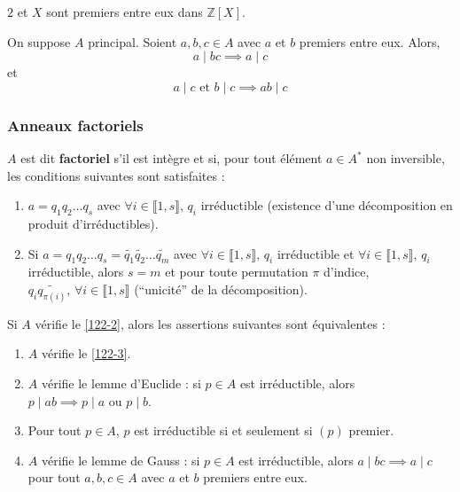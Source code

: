   \begin{example}
    $2$ et $X$ sont premiers entre eux dans $\mathbb{Z}[X]$.
  \end{example}

  \begin{lemma}[Gauss]
    On suppose $A$ principal. Soient $a, b, c \in A$ avec $a$ et $b$ premiers entre eux. Alors,
    \[ a \mid bc \implies a \mid c \]
    et
    \[ a \mid c \text{ et } b \mid c \implies ab \mid c \]
  \end{lemma}

  \subsubsection{Anneaux factoriels}


  \begin{definition}
    $A$ est dit \textbf{factoriel} s'il est intègre et si, pour tout élément $a \in A^*$ non inversible, les conditions suivantes sont satisfaites :
    \begin{enumerate}[label=(\roman*)]
      \item \label{122-2} $a = q_1 q_2 \dots q_s$ avec $\forall i \in \llbracket 1, s \rrbracket, \, q_i$ irréductible (existence d'une décomposition en produit d'irréductibles).
      \item \label{122-3} Si $a = q_1 q_2 \dots q_s = \widetilde{q_1} \widetilde{q_2} \dots \widetilde{q_m}$ avec $\forall i \in \llbracket 1, s \rrbracket, \, q_i$ irréductible et $\forall i \in \llbracket 1, s \rrbracket, \, q_i$ irréductible, alors $s = m$ et pour toute permutation $\pi$ d'indice, $q_i \widetilde{q_{\pi(i)}}, \, \forall i \in \llbracket 1, s \rrbracket$ (``unicité'' de la décomposition).
    \end{enumerate}
  \end{definition}


  \begin{proposition}
    Si $A$ vérifie le \cref{122-2}, alors les assertions suivantes sont équivalentes :
    \begin{enumerate}[label=(\roman*)]
      \item $A$ vérifie le \cref{122-3}.
      \item $A$ vérifie le lemme d'Euclide : si $p \in A$ est irréductible, alors $p \mid ab \implies p \mid a \text { ou } p \mid b$.
      \item Pour tout $p \in A$, $p$ est irréductible si et seulement si $(p)$ premier.
      \item $A$ vérifie le lemme de Gauss : si $p \in A$ est irréductible, alors $a \mid bc \implies a \mid c$ pour tout $a, b, c \in A$ avec $a$ et $b$ premiers entre eux.
    \end{enumerate}
  \end{proposition}

